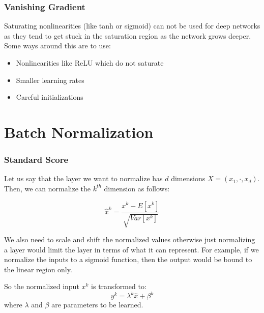 \begin{frame}
        \frametitle{Vanishing Gradient}
        Saturating nonlinearities (like tanh or sigmoid) can not be used for deep networks as they tend to get stuck in the saturation region as the network grows deeper. Some ways around this are to use:
        \begin{itemize}
                 \item Nonlinearities like ReLU which do not saturate
                 \item Smaller learning rates
                 \item Careful initializations

        \end{itemize}
\end{frame}


\section{Batch Normalization}
\begin{frame}
    \frametitle{Standard Score}
        Let us say that the layer we want to normalize has $d$ dimensions $X = (x_1, \cdot, x_d)$. Then, we can normalize the $k^{th}$ dimension as follows:\par
        \begin{equation}
                \hat{x}^{k} = \frac{x^k - E[x^k]}{\sqrt{Var[x^k]}}
        \end{equation}
\end{frame}

\begin{frame}
        We also need to scale and shift the normalized values otherwise just normalizing a layer would limit the layer in terms of what it can represent. For example, if we normalize the inputs to a sigmoid function, then the output would be bound to the linear region only. \par
        So the normalized input $x^k$ is transformed to:
        \begin{equation}
                y^k = \lambda^{k} \hat{x} + \beta^{k}
        \end{equation}
        where $\lambda$ and $\beta$ are parameters to be learned.\par
\end{frame}

